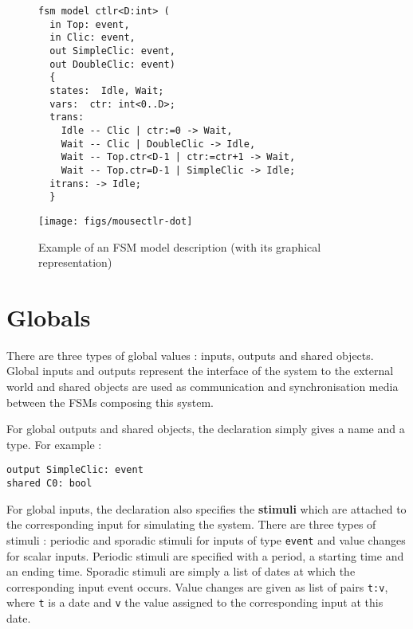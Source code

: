 \begin{figure}[t]
  \begin{minipage}[b]{0.6\linewidth}
   \centering
\begin{lstlisting}[language=Rfsm,frame=single,basicstyle=\small]
fsm model ctlr<D:int> (
  in Top: event,
  in Clic: event,
  out SimpleClic: event,
  out DoubleClic: event)
  {
  states:  Idle, Wait;
  vars:  ctr: int<0..D>;
  trans:
    Idle -- Clic | ctr:=0 -> Wait,
    Wait -- Clic | DoubleClic -> Idle,
    Wait -- Top.ctr<D-1 | ctr:=ctr+1 -> Wait,
    Wait -- Top.ctr=D-1 | SimpleClic -> Idle;
  itrans: -> Idle;
  }
\end{lstlisting}
  \end{minipage}
  \begin{minipage}[b]{0.4\linewidth}
   \texttt{[image: figs/mousectlr-dot]}
   \centering
  \end{minipage}
\hfill
  \caption{Example of an FSM model description (with its graphical representation)}
  \label{fig:fsm-model-ex}
\end{figure}



\section{Globals}
\label{sec:globals}

There are three types of global values : inputs, outputs and shared objects. Global inputs and
outputs represent the interface of the system to the external world and shared objects are used as
communication and synchronisation media between the FSMs composing this system.

For global outputs and shared objects, the declaration simply gives a name and a type. For example :

\begin{lstlisting}[language=Rfsm,frame=single,basicstyle=\small]
output SimpleClic: event
shared C0: bool
\end{lstlisting}

For global inputs, the declaration also specifies the \textbf{stimuli} which are attached to the
corresponding input for simulating the system. There are three types of stimuli : periodic and
sporadic stimuli for inputs of type \verb|event| and value changes for scalar inputs.
Periodic stimuli are specified with a period, a starting time and an ending time. Sporadic stimuli
are simply a list of dates at which the corresponding input event occurs. Value changes are given as
list of pairs \verb|t:v|, where \verb|t| is a date and \verb|v| the value assigned to the
corresponding input at this date. 


